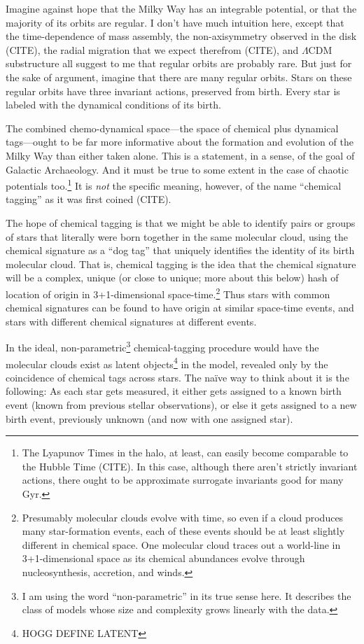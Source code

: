 \documentclass[11pt, letterpaper]{article}
\begin{document}
Imagine against hope that the Milky Way has an integrable potential,
or that the majority of its orbits are regular. I don't have much
intuition here, except that the time-dependence of mass assembly, the
non-axisymmetry observed in the disk (CITE), the radial migration
that we expect therefrom (CITE), and $\Lambda$CDM substructure all
suggest to me that regular orbits are probably rare. But just for the
sake of argument, imagine that there are many regular orbits. Stars on
these regular orbits have three invariant actions, preserved from
birth. Every star is labeled with the dynamical conditions of its
birth.

The combined chemo-dynamical space---the space of chemical plus
dynamical tags---ought to be far more informative about the formation
and evolution of the Milky Way than either taken alone. This is a
statement, in a sense, of the goal of Galactic Archaeology.  And it
must be true to some extent in the case of chaotic potentials
too.\footnote{The Lyapunov Times in the halo, at least, can easily
  become comparable to the Hubble Time (CITE). In this case, although
  there aren't strictly invariant actions, there ought to be
  approximate surrogate invariants good for many Gyr.} It is
\emph{not} the specific meaning, however, of the name ``chemical
tagging'' as it was first coined (CITE).

The hope of chemical tagging is that we might be able to identify
pairs or groups of stars that literally were born together in the same
molecular cloud, using the chemical signature as a ``dog tag'' that
uniquely identifies the identity of its birth molecular cloud. That
is, chemical tagging is the idea that the chemical signature will be a
complex, unique (or close to unique; more about this below) hash of
location of origin in 3+1-dimensional space-time.\footnote{Presumably
  molecular clouds evolve with time, so even if a cloud produces many
  star-formation events, each of these events should be at least
  slightly different in chemical space. One molecular cloud traces out
  a world-line in 3+1-dimensional space as its chemical abundances
  evolve through nucleosynthesis, accretion, and winds.}  Thus stars
with common chemical signatures can be found to have origin at similar
space-time events, and stars with different chemical signatures at
different events.

In the ideal, non-parametric\footnote{I am using the word
  ``non-parametric'' in its true sense here. It describes the class of
  models whose size and complexity grows linearly with the data.}
chemical-tagging procedure would have the molecular clouds exist as
latent objects\footnote{HOGG DEFINE LATENT} in the model, revealed
only by the coincidence of chemical tags across stars. The na\"ive way
to think about it is the following: As each star gets measured, it
either gets assigned to a known birth event (known from previous
stellar observations), or else it gets assigned to a new birth event,
previously unknown (and now with one assigned star).
\end{document}
